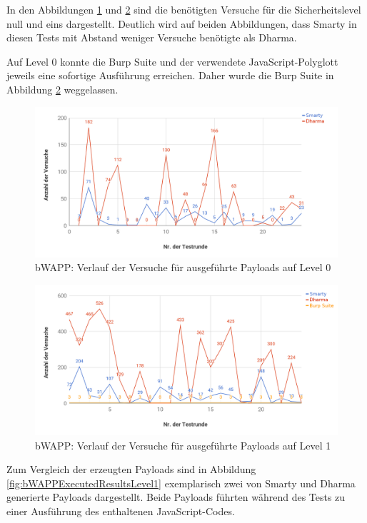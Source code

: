In den Abbildungen \ref{fig:bWAPPLvl0ExecutedTries} und \ref{fig:bWAPPLvl1ExecutedTries} sind die benötigten Versuche für die Sicherheitslevel null und eins dargestellt. Deutlich wird auf beiden Abbildungen, dass Smarty in diesen Tests mit Abstand weniger Versuche benötigte als Dharma.

Auf Level 0 konnte die Burp Suite und der verwendete JavaScript-Polyglott jeweils eine sofortige Ausführung erreichen. Daher wurde die Burp Suite in Abbildung \ref{fig:bWAPPLvl1ExecutedTries} weggelassen.

\begin{figure}[htbp] 
	\centering
	\includegraphics[width=\textwidth]{contents/images/bWAPPLvl0ExecutedTries}
	\caption{bWAPP: Verlauf der Versuche für ausgeführte Payloads auf Level 0}
	\label{fig:bWAPPLvl0ExecutedTries}
\end{figure}

\begin{figure}[htbp] 
	\centering
	\includegraphics[width=\textwidth]{contents/images/bWAPPLvl1ExecutedTries}
	\caption{bWAPP: Verlauf der Versuche für ausgeführte Payloads auf Level 1}
	\label{fig:bWAPPLvl1ExecutedTries}
\end{figure}

Zum Vergleich der erzeugten Payloads sind in Abbildung \ref{fig:bWAPPExecutedResultsLevel1} exemplarisch zwei von Smarty und Dharma generierte Payloads dargestellt. Beide Payloads führten während des Tests zu einer Ausführung des enthaltenen JavaScript-Codes.

